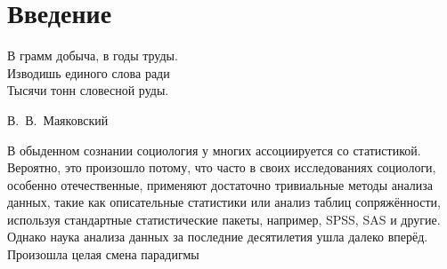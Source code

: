 \chapter*{Введение}							%
\epigraph{В грамм добыча, в годы труды.\\
Изводишь единого слова ради\\
Тысячи тонн словесной руды.}{В.~В.~Маяковский}

В обыденном сознании социология у многих ассоциируется со статистикой. Вероятно, это произошло потому, что часто в своих исследованиях социологи, особенно отечественные, применяют достаточно тривиальные методы анализа данных, такие как описательные статистики или анализ таблиц сопряжённости, используя стандартные статистические пакеты, например, SPSS, SAS и другие. Однако наука анализа данных за последние десятилетия ушла далеко вперёд. Произошла целая смена парадигмы\cite{Davydov_Knowledge}





\clearpage
